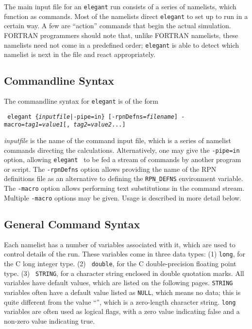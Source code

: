 \documentclass[11pt]{article}
\begin{document}
The main input file for an {\tt elegant} run consists of a series of
namelists, which function as commands.  Most of the namelists direct
{\tt elegant} to set up to run in a certain way.  A few are ``action''
commands that begin the actual simulation.  FORTRAN programmers should
note that, unlike FORTRAN namelists, these namelists need not come in
a predefined order; {\tt elegant} is able to detect which namelist is
next in the file and react appropriately.

\subsection{Commandline Syntax}

The commandline syntax for {\tt elegant} is of the form
\begin{flushleft}{\tt
elegant \{{\em inputfile}|-pipe=in\} [-rpnDefns={\em filename}] -macro={\em tag1}={\em value1}[,{\em
tag2}={\em value2}...]  }\end{flushleft} 
{\em inputfile} is the name of the command input file, which is a series of
namelist commands directing the calculations.
Alternatively, one may give the \verb|-pipe=in| option, allowing {\tt elegant } to be
fed a stream of commands by another program or script.
The \verb|-rpnDefns| option allows providing the name of the RPN definitions file as an alternative
to defining the \verb|RPN_DEFNS| environment variable.
The \verb|-macro| option allows performing text substitutions in the command stream.
Multiple \verb|-macro| options may be given.
Usage is described in more detail below.

\subsection{General Command Syntax}

Each namelist has a number of variables associated with it, which are
used to control details of the run.  These variables come in three
data types: (1) {\tt long}, for the C long integer type.  (2) {\tt
double}, for the C double-precision floating point type. (3) {\tt
STRING}, for a character string enclosed in double quotation marks.
All variables have default values, which are listed on the following
pages.  {\tt STRING} variables often have a default value listed as
{\tt NULL}, which means no data; this is quite different from the
value ``'', which is a zero-length character string.  {\tt long}
variables are often used as logical flags, with a zero value
indicating false and a non-zero value indicating true.
\end{document}
